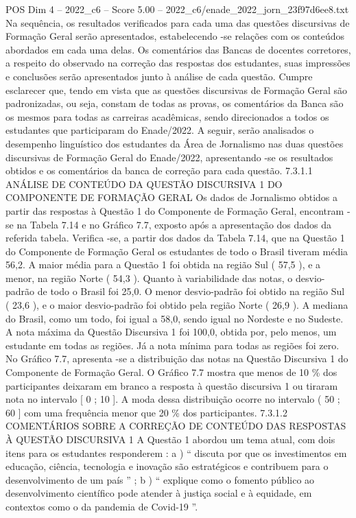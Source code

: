 \begin{textsample}{POS Dim 4 – 2022\_c6 – Score 5.00 – 2022\_c6/enade\_2022\_jorn\_23f97d6ee8.txt}
Na sequência, os resultados verificados para cada uma das questões discursivas de Formação Geral serão apresentados, estabelecendo -se relações com os conteúdos abordados em cada uma delas.
Os comentários das Bancas de docentes corretores, a respeito do observado na correção das respostas dos estudantes, suas impressões e conclusões serão apresentados junto à análise de cada questão.
Cumpre esclarecer que, tendo em vista que as questões discursivas de Formação Geral são padronizadas, ou seja, constam de todas as provas, os comentários da Banca são os mesmos para todas as carreiras acadêmicas, sendo direcionados a todos os estudantes que participaram do Enade/2022.
A seguir, serão analisados o desempenho linguístico dos estudantes da Área de Jornalismo nas duas questões discursivas de Formação Geral do Enade/2022, apresentando -se os resultados obtidos e os comentários da banca de correção para cada questão. 7.3.1.1 ANÁLISE DE CONTEÚDO DA QUESTÃO DISCURSIVA 1 DO COMPONENTE DE FORMAÇÃO GERAL Os dados de Jornalismo obtidos a partir das respostas à Questão 1 do Componente de Formação Geral, encontram -se na Tabela 7.14 e no Gráfico 7.7, exposto após a apresentação dos dados da referida tabela.
Verifica -se, a partir dos dados da Tabela 7.14, que na Questão 1 do Componente de Formação Geral os estudantes de todo o Brasil tiveram média 56,2.
A maior média para a Questão 1 foi obtida na região Sul ( 57,5 ), e a menor, na região Norte ( 54,3 ).
Quanto à variabilidade das notas, o desvio-padrão de todo o Brasil foi 25,0.
O menor desvio-padrão foi obtido na região Sul ( 23,6 ), e o maior desvio-padrão foi obtido pela região Norte ( 26,9 ).
A mediana do Brasil, como um todo, foi igual a 58,0, sendo igual no Nordeste e no Sudeste.
A nota máxima da Questão Discursiva 1 foi 100,0, obtida por, pelo menos, um estudante em todas as regiões.
Já a nota mínima para todas as regiões foi zero.
No Gráfico 7.7, apresenta -se a distribuição das notas na Questão Discursiva 1 do Componente de Formação Geral.
O Gráfico 7.7 mostra que menos de 10 \% dos participantes deixaram em branco a resposta à questão discursiva 1 ou tiraram nota no intervalo [ 0 ; 10 ].
A moda dessa distribuição ocorre no intervalo ( 50 ; 60 ] com uma frequência menor que 20 \% dos participantes. 7.3.1.2 COMENTÁRIOS SOBRE A CORREÇÃO DE CONTEÚDO DAS RESPOSTAS À QUESTÃO DISCURSIVA 1 A Questão 1 abordou um tema atual, com dois itens para os estudantes responderem : a ) “ discuta por que os investimentos em educação, ciência, tecnologia e inovação são estratégicos e contribuem para o desenvolvimento de um país ” ; b ) “ explique como o fomento público ao desenvolvimento científico pode atender à justiça social e à equidade, em contextos como o da pandemia de Covid-19 ”.

\end{textsample}
